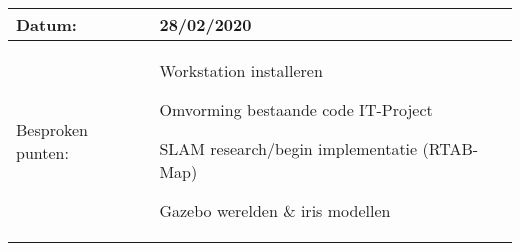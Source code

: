 \begin{tabularx}{\textwidth}{| l | X |}
  \hline
  Datum: & 28/02/2020\\
  \hline
  Besproken punten: &
  \begin{compactitem}
    \item Workstation installeren
    \item Omvorming bestaande code IT-Project
    \item SLAM research/begin implementatie (RTAB-Map)
    \item Gazebo werelden \& iris modellen
  \end{compactitem}\\
  \hline
\end{tabularx}